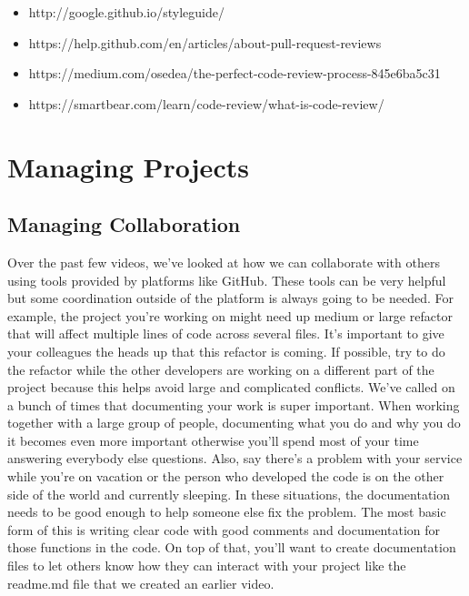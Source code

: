 	\begin{itemize}
		\item http://google.github.io/styleguide/
		
		\item https://help.github.com/en/articles/about-pull-request-reviews
		
		\item https://medium.com/osedea/the-perfect-code-review-process-845e6ba5c31
		
		\item https://smartbear.com/learn/code-review/what-is-code-review/
	\end{itemize}

\section{Managing Projects}
	
	\subsection{Managing Collaboration}
	
	Over the past few videos, we've looked at how we can collaborate with others using tools provided by platforms like GitHub. These tools can be very helpful but some coordination outside of the platform is always going to be needed. For example, the project you're working on might need up medium or large refactor that will affect multiple lines of code across several files. It's important to give your colleagues the heads up that this refactor is coming. If possible, try to do the refactor while the other developers are working on a different part of the project because this helps avoid large and complicated conflicts. We've called on a bunch of times that documenting your work is super important. When working together with a large group of people, documenting what you do and why you do it becomes even more important otherwise you'll spend most of your time answering everybody else questions. Also, say there's a problem with your service while you're on vacation or the person who developed the code is on the other side of the world and currently sleeping. In these situations, the documentation needs to be good enough to help someone else fix the problem. The most basic form of this is writing clear code with good comments and documentation for those functions in the code. On top of that, you'll want to create documentation files to let others know how they can interact with your project like the readme.md file that we created an earlier video. 
	
